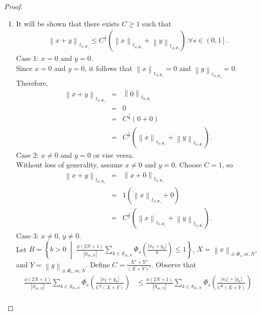 \documentclass[10pt,a4paper]{amsart}
\begin{document}
\begin{proof}
\begin{enumerate}
        \item It will be shown that there exists $C\geq 1$ such that
        \begin{eqnarray*}
            \left\lVert x+y \right\rVert _{\ell_{\phi,\Phi_s}}\leq C^{\frac{1}{s}} \left(\left\lVert x \right\rVert _{\ell_{\phi, \Phi_s}} + \left\lVert y \right\rVert _{\ell_{\phi, \Phi_s}} \right). \forall s\in \left(0,1\right].
        \end{eqnarray*}
        Case 1: $x=0$ and $y=0$.\\
        Since $x=0$ and $y=0$, it follows that $\left\lVert x \right\rVert _{\ell_{\phi,\Phi_s}}=0$ and $\left\lVert y \right\rVert _{\ell_{\phi,\Phi_s}}=0$.
        Therefore,
        \begin{eqnarray*}
            \left\lVert x+y \right\rVert _{\ell_{\phi,\Phi_s}} &=&\left\lVert 0 \right\rVert _{\ell_{\phi,\Phi_s}}\\
            &=& 0\\
            &=& C^{\frac{1}{s}}\left(0+0\right)\\
            &=& C^{\frac{1}{s}}\left(\left\lVert x \right\rVert _{\ell_{\phi,\Phi_s}}+\left\lVert y \right\rVert _{\ell_{\phi,\Phi_s}}\right). 
        \end{eqnarray*}
        Case 2: $x\neq0$ and $y=0$ or vise versa.\\  
        Without loss of generality, assume $x\neq0$ and $y=0$. Choose $C=1$, so 
        \begin{eqnarray*}
            \left\lVert x+y \right\rVert _{\ell_{\phi,\Phi_s}} &=&\left\lVert x+0 \right\rVert _{\ell_{\phi,\Phi_s}}\\
            &=& 1\left(\left\lVert x \right\rVert _{\ell_{\phi,\Phi_s}}+0\right)\\ &=&C^{\frac{1}{s}}\left(\left\lVert x \right\rVert _{\ell_{\phi,\Phi_s}}+\left\lVert y \right\rVert _{\ell_{\phi,\Phi_s}}\right).
        \end{eqnarray*}
        Case 3: $x\neq 0$, $y\neq 0$.\\
        Let $B = \left\{b > 0 \;\middle|\; \frac{\phi\left(2N+1\right)}{\left|S_{m,N}\right|}\sum_{k\in S_{m,N}} \Phi_s \left(\frac{\left|x_k + y_k\right|}{b}\right) \leq 1\right\}$, $X=\left\lVert x \right\rVert _{\phi, \Phi_s, m, N}$, and $Y=\left\lVert y\right\rVert _{\phi, \Phi_s, m, N}$.
        Define $C = \frac{X^s + Y^s}{(X + Y)^s}$. Observe that
        \begin{eqnarray*}
            \frac{\phi\left(2N+1\right)}{\left|S_{m,N}\right|}\sum_{k\in S_{m,N}}\Phi_s\left(\frac{\left|x_k+y_k\right|}{C^{\frac{1}{s}} \left(X+Y\right)}\right) &\leq  \frac{\phi\left(2N+1\right)}{\left|S_{m,N}\right|}\sum_{k\in S_{m,N}}\Phi_s\left(\frac{\left|x_k\right|+\left|y_k\right|}{C^{\frac{1}{s}} \left(X+Y\right)}\right)\\

\end{eqnarray*}
\end{enumerate}
\end{proof}
\end{document}
